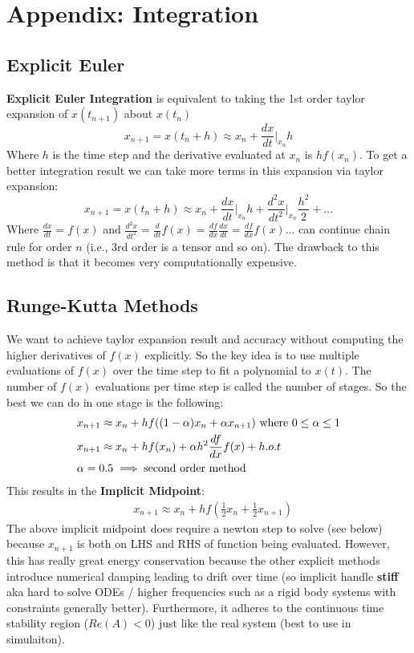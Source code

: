 \documentclass{article}
\begin{document}
\section{Appendix: Integration}

\subsection{Explicit Euler}

\textbf{Explicit Euler Integration} is equivalent to taking the 1st order taylor expansion of $x(t_{n+1})$ about $x(t_n)$
\begin{equation}
    x_{n+1}=x(t_n + h) \approx x_n + \frac{dx}{dt}\big|_{x_n}h
\end{equation}
Where $h$ is the time step and the derivative evaluated at $x_n$ is $h f(x_n)$. To get a better integration result we can take more terms in this expansion via taylor expansion:
\begin{equation}
    x_{n+1}=x(t_n + h) \approx x_n + \frac{dx}{dt}\big|_{x_n}h + \frac{d^2x}{dt^2}\big|_{x_n}\frac{h^2}{2} + ...
\end{equation}
Where $\frac{dx}{dt} = f(x)$ and $\frac{d^2x}{dt^2} = \frac{d}{dt}f(x) = \frac{df}{dx}\frac{dx}{dt} = \frac{df}{dx}f(x)$... can continue chain rule for order $n$ (i.e., 3rd order is a tensor and so on). The drawback to this method is that it becomes very computationally expensive.

\subsection{Runge-Kutta Methods}

We want to achieve taylor expansion result and accuracy without computing the higher derivatives of $f(x)$ explicitly. So the key idea is to use multiple evaluations of $f(x)$ over the time step to fit a polynomial to $x(t)$. The number of $f(x)$ evaluations per time step is called the number of stages. So the best we can do in one stage is the following:
\begin{align*}
    & x_{n+1} \approx x_n + h f((1 - \alpha)x_n + \alpha x_{n+1}) \text{ where } 0 \le \alpha \le 1 \notag \\
    & x_{n+1} \approx x_n + h f(x_n) + \alpha h^2 \frac{df}{dx}f(x) + h.o.t\\
    & \alpha = 0.5 \implies \text{second order method}
\end{align*}
This results in the \textbf{Implicit Midpoint}:
\begin{align}
    & x_{n+1} \approx x_n + h f(\frac{1}{2}x_n + \frac{1}{2}x_{n+1})
\end{align}
The above implicit midpoint does require a newton step to solve (see below) because $x_{n+1}$ is both on LHS and RHS of function being evaluated. However, this has really great energy conservation because the other explicit methods introduce numerical damping leading to drift over time (so implicit handle \textbf{stiff} aka hard to solve ODEs / higher frequencies such as a rigid body systems with constraints generally better). Furthermore, it adheres to the continuous time stability region ($Re(A) < 0$) just like the real system (best to use in simulaiton).
\end{document}
